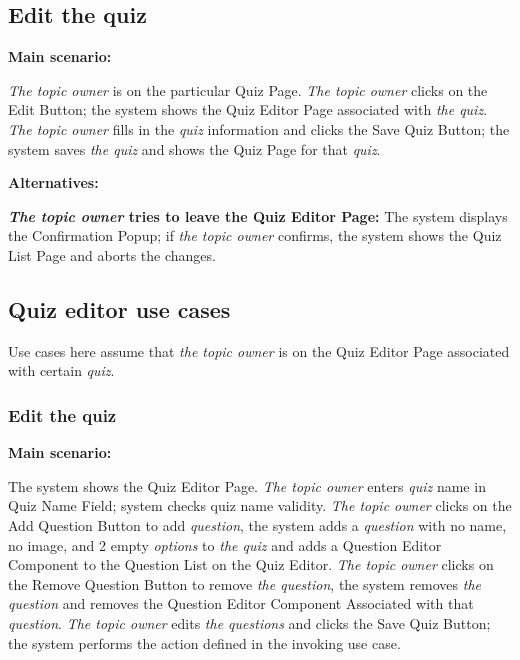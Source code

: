 \documentclass[
    english, %
]{VUMIFPSkursinis}
\begin{document}
\subsection{Edit the quiz}

\noindent\textbf{\fontsize{13}{15}\selectfont Main scenario:}

\textit{The topic owner} is on the particular Quiz Page. \textit{The topic owner} clicks on the Edit Button; the system shows the Quiz Editor Page associated with \textit{the quiz}. \textit{The topic owner} fills in the \textit{quiz} information and clicks the Save Quiz Button; the system saves \textit{the quiz} and shows the Quiz Page for that \textit{quiz}.

\noindent\textbf{\fontsize{13}{15}\selectfont Alternatives:}

\textbf{\textit{The topic owner} tries to leave the Quiz Editor Page:} The system displays the Confirmation Popup; if \textit{the topic owner} confirms, the system shows the Quiz List Page and aborts the changes.

\subsection{Quiz editor use cases}

Use cases here assume that \textit{the topic owner} is on the Quiz Editor Page associated with certain \textit{quiz}.

\subsubsection{Edit the quiz}

\noindent\textbf{\fontsize{13}{15}\selectfont Main scenario:}

The system shows the Quiz Editor Page. \textit{The topic owner} enters \textit{quiz} name in Quiz Name Field; system checks quiz name validity. \textit{The topic owner} clicks on the Add Question Button to add \textit{question}, the system adds a \textit{question} with no name, no image, and 2 empty \textit{options} to \textit{the quiz} and adds a Question Editor Component to the Question List on the Quiz Editor. \textit{The topic owner} clicks on the Remove Question Button to remove \textit{the question}, the system removes \textit{the question} and removes the Question Editor Component Associated with that \textit{question}. \textit{The topic owner} edits \textit{the questions} and clicks the Save Quiz Button; the system performs the action defined in the invoking use case.
\end{document}
